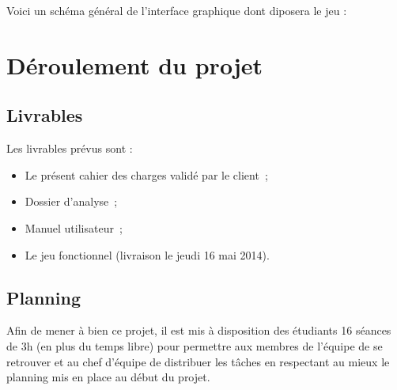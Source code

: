 \documentclass[11pt]{article}
\begin{document}
Voici un schéma général de l'interface graphique dont diposera le jeu :





\newpage %

\section{Déroulement du projet}


\subsection{Livrables}

Les livrables prévus sont :

\begin{itemize}
   \item Le présent cahier des charges validé par le client~;
   \item Dossier d'analyse~;
   \item Manuel utilisateur~;
   \item Le jeu fonctionnel (livraison le jeudi 16 mai 2014).
\end{itemize}


\subsection{Planning}

Afin de mener à bien ce projet, il est mis à disposition des étudiants 16 séances de 3h (en plus du temps libre) pour permettre aux membres de l'équipe de se retrouver et au chef d'équipe de distribuer les tâches en respectant au mieux le planning mis en place au début du projet.
\end{document}
